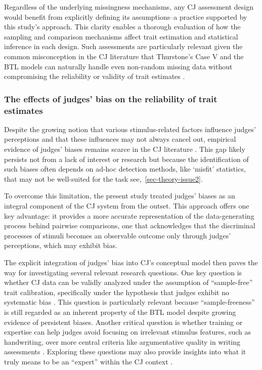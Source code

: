 \documentclass[
  authoryear,
  review,
  1p]{elsarticle}
\begin{document}
Regardless of the underlying missingness mechanisms, any CJ assessment
design would benefit from explicitly defining its assumptions--a
practice supported by this study's approach. This clarity enables a
thorough evaluation of how the sampling and comparison mechanisms affect
trait estimation and statistical inference in each design. Such
assessments are particularly relevant given the common misconception in
the CJ literature that Thurstone's Case V and the BTL models can
naturally handle even non-random missing data without compromising the
reliability or validity of trait estimates \citep{Bramley_2008}.

\subsubsection{The effects of judges' bias on the reliability of trait
estimates}\label{sec-discussion_RA2}

Despite the growing notion that various stimulus-related factors
influence judges' perceptions
\citep{vanDaal_et_al_2016, Lesterhuis_et_al_2018, Chambers_et_al_2022}
and that these influences may not always cancel out, empirical evidence
of judges' biases remains scarce in the CJ literature
\citep{Pollitt_et_al_2003, vanDaal_et_al_2016, Bartholomew_et_al_2020a}.
This gap likely persists not from a lack of interest or research but
because the identification of such biases often depends on ad-hoc
detection methods, like `misfit' statistics, that may not be well-suited
for the task see,~\ref{sec-theory-issue2}.

To overcome this limitation, the present study treated judges' biases as
an integral component of the CJ system from the outset. This approach
offers one key advantage: it provides a more accurate representation of
the data-generating process behind pairwise comparisons, one that
acknowledges that the discriminal processes of stimuli becomes an
observable outcome only through judges' perceptions, which may exhibit
bias.

The explicit integration of judges' bias into CJ's conceptual model then
paves the way for investigating several relevant research questions. One
key question is whether CJ data can be validly analyzed under the
assumption of ``sample-free'' trait calibration, specifically under the
hypothesis that judges exhibit no systematic bias . This question is
particularly relevant because ``sample-freeness'' is still regarded as
an inherent property of the BTL model \citep{Bramley_2008, Andrich_1978}
despite growing evidence of persistent biases. Another critical question
is whether training or expertise can help judges avoid focusing on
irrelevant stimulus features, such as handwriting, over more central
criteria like argumentative quality in writing assessments
\citep{Kelly_et_al_2022}. Exploring these questions may also provide
insights into what it truly means to be an ``expert'' within the CJ
context \citep{Kelly_et_al_2022}.
\end{document}
